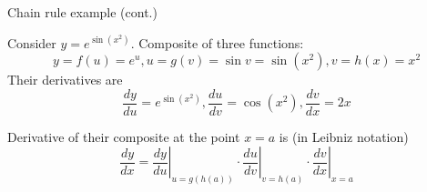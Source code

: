 \documentclass[12pt,aspectratio=169,handout]{beamer}
\begin{document}
\begin{frame}{Chain rule example (cont.)}
	
	Consider $y=e^{\sin(x^{2})}$. Composite of three functions:
	$$y = f(u) = e^u, u = g(v) = \sin v = \sin (x^2), v = h(x) = x^2$$
	Their derivatives are
	$$\frac{dy}{du} = e^{\sin(x^{2})}, \frac{du}{dv} = \cos (x^2), \frac{dv}{dx} = 2x$$
	
	\pause
	
	Derivative of their composite at the point $x = a$ is (in Leibniz notation)
	$$
	{\frac {dy}{dx}}=\left.{\frac {dy}{du}}\right|_{u=g(h(a))}\cdot \left.{\frac {du}{dv}}\right|_{v=h(a)}\cdot \left.{\frac {dv}{dx}}\right|_{x=a}
	$$
	
\end{frame}
\end{document}
